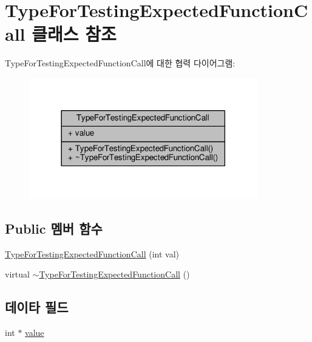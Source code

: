 \hypertarget{class_type_for_testing_expected_function_call}{}\section{Type\+For\+Testing\+Expected\+Function\+Call 클래스 참조}
\label{class_type_for_testing_expected_function_call}


Type\+For\+Testing\+Expected\+Function\+Call에 대한 협력 다이어그램\+:
\nopagebreak
\begin{figure}[H]
\begin{center}
\leavevmode
\includegraphics[width=282pt]{class_type_for_testing_expected_function_call__coll__graph}
\end{center}
\end{figure}
\subsection*{Public 멤버 함수}
\begin{DoxyCompactItemize}
\item 
\hyperlink{class_type_for_testing_expected_function_call_a523949dfb3071b2a73c7ac273f515a43}{Type\+For\+Testing\+Expected\+Function\+Call} (int val)
\item 
virtual \hyperlink{class_type_for_testing_expected_function_call_a1be5186eb5d5ede8f56d1dce1e508ab2}{$\sim$\+Type\+For\+Testing\+Expected\+Function\+Call} ()
\end{DoxyCompactItemize}
\subsection*{데이타 필드}
\begin{DoxyCompactItemize}
\item 
int $\ast$ \hyperlink{class_type_for_testing_expected_function_call_a1f383aee95bb3864942bbeb7416cbcad}{value}
\end{DoxyCompactItemize}


